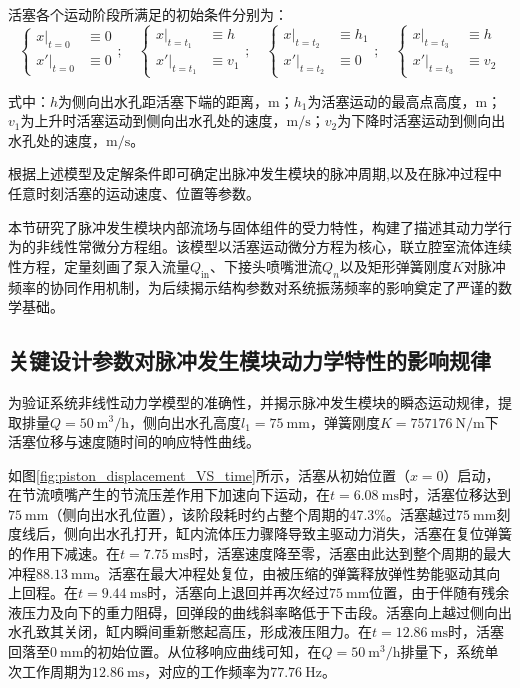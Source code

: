 活塞各个运动阶段所满足的初始条件分别为：
\begin{equation}
\left\{
\begin{aligned}
x\big|_{t=0} &\equiv 0 \\
x'\big|_{t=0} &\equiv 0
\end{aligned}
\right.
;\quad
\left\{
\begin{aligned}
x\big|_{t=t_1} &\equiv h \\
x'\big|_{t=t_1} &\equiv v_1
\end{aligned}
\right.
;\quad
\left\{
\begin{aligned}
x\big|_{t=t_2} &\equiv h_1 \\
x'\big|_{t=t_2} &\equiv 0
\end{aligned}
\right.
;\quad
\left\{
\begin{aligned}
x\big|_{t=t_3} &\equiv h \\
x'\big|_{t=t_3} &\equiv v_2
\end{aligned}
\right.
\end{equation}

式中：$h$为侧向出水孔距活塞下端的距离，$\mathrm{m}$；$h_1$为活塞运动的最高点高度，$\mathrm{m}$；$v_1$为上升时活塞运动到侧向出水孔处的速度，$\mathrm{m/s}$；$v_2$为下降时活塞运动到侧向出水孔处的速度，$\mathrm{m/s}$。

根据上述模型及定解条件即可确定出脉冲发生模块的脉冲周期,以及在脉冲过程中任意时刻活塞的运动速度、位置等参数\cite{ref27,ref28}。

本节研究了脉冲发生模块内部流场与固体组件的受力特性，构建了描述其动力学行为的非线性常微分方程组。该模型以活塞运动微分方程为核心，联立腔室流体连续性方程，定量刻画了泵入流量$Q_{\mathrm{in}}$、下接头喷嘴泄流$Q_n$以及矩形弹簧刚度$K$对脉冲频率的协同作用机制，为后续揭示结构参数对系统振荡频率的影响奠定了严谨的数学基础。

\subsection{关键设计参数对脉冲发生模块动力学特性的影响规律}

为验证系统非线性动力学模型的准确性，并揭示脉冲发生模块的瞬态运动规律，提取排量$Q=50\ \mathrm{m^3/h}$，侧向出水孔高度$l_1=75\ \mathrm{mm}$，弹簧刚度$K=757176\ \mathrm{N/m}$下活塞位移与速度随时间的响应特性曲线。

如图\ref{fig:piston_displacement_VS_time}所示，活塞从初始位置（$x=0$）启动，在节流喷嘴产生的节流压差作用下加速向下运动，在$t=6.08\ \mathrm{ms}$时，活塞位移达到$75\ \mathrm{mm}$（侧向出水孔位置），该阶段耗时约占整个周期的47.3\%。活塞越过$75\ \mathrm{mm}$刻度线后，侧向出水孔打开，缸内流体压力骤降导致主驱动力消失，活塞在复位弹簧的作用下减速。在$t=7.75\ \mathrm{ms}$时，活塞速度降至零，活塞由此达到整个周期的最大冲程$88.13\ \mathrm{mm}$。活塞在最大冲程处复位，由被压缩的弹簧释放弹性势能驱动其向上回程。在$t=9.44\ \mathrm{ms}$时，活塞向上退回并再次经过$75\ \mathrm{mm}$位置，由于伴随有残余液压力及向下的重力阻碍，回弹段的曲线斜率略低于下击段。活塞向上越过侧向出水孔致其关闭，缸内瞬间重新憋起高压，形成液压阻力。在$t=12.86\ \mathrm{ms}$时，活塞回落至$0\ \mathrm{mm}$的初始位置。从位移响应曲线可知，在$Q=50\ \mathrm{m^3/h}$排量下，系统单次工作周期为$12.86\ \mathrm{ms}$，对应的工作频率为$77.76\ \mathrm{Hz}$。

